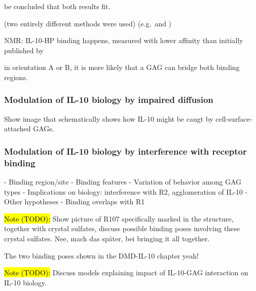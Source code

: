 be concluded that both results fit.


 (two entirely different methods were used) (e.g.\ and )



NMR: IL-10-HP binding happens, measured with lower affinity than initially published by


in orientation A or B, it is more likely that a GAG can bridge both binding
regions.


\subsubsection{Modulation of IL-10 biology by impaired diffusion}
Show image that schematically shows how IL-10 might be caugt by cell-surface-attached GAGs.


\subsubsection{Modulation of IL-10 biology by interference with receptor
binding}

    - Binding region/site
    - Binding features
    - Variation of behavior among GAG types
    - Implications on biology: interference with R2, agglomeration of IL-10
    - Other hypotheses
        - Binding overlaps with R1


\hl{Note (TODO):}
Show picture of R107 specifically marked in the structure, together with
crystal sulfates, discuss possible binding poses involving these crystal
sulfates. Nee, mach das später, bei bringing it all together.

The two binding poses shown in the DMD-IL-10 chapter yeah!


\hl{Note (TODO):}
Discuss models explaining impact of IL-10-GAG interaction on IL-10 biology.



